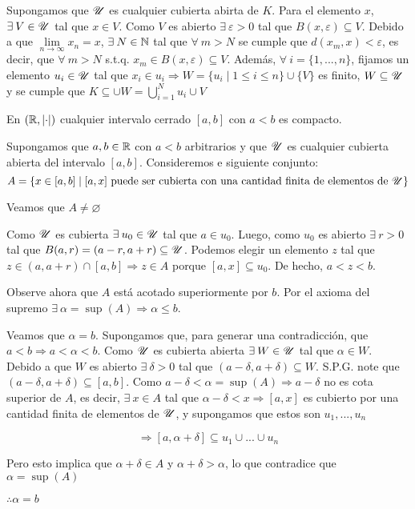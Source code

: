 \begin{proofexplanation}
    Supongamos que $\mathscr{U}$ es cualquier cubierta abirta de $K$. Para el elemento $x$, $\exists \: V \in \mathscr{U}$ tal que $x \in V$. Como $V$ es abierto $\exists \: \varepsilon > 0$ tal que $B(x,\varepsilon) \subseteq V$. Debido a que $\lim\limits_{n \to \infty} x_n = x$, $\exists \: N \in \mathbb{N}$ tal que $\forall \: m > N$ se cumple que $d(x_m,x) < \varepsilon$, es decir, que $\forall \: m > N$ s.t.q. $x_m \in B(x,\varepsilon) \subseteq V$. Además, $\forall \: i = \{ 1, ..., n \}$, fijamos un elemento $u_i \in \mathscr{U}$ tal que $x_i \in u_i \Rightarrow W = \{ u_i \mid 1 \leqslant i \leqslant n \} \cup \{ V \}$ es finito, $W \subseteq \mathscr{U}$ y se cumple que $K \subseteq \cup W =  \bigcup_{i=1}^{N} u_i \cup V$
\end{proofexplanation}

\begin{eg}
    En $(\mathbb{R}, \abs{\cdot})$ cualquier intervalo cerrado $[a,b]$ con $a < b$ es compacto.
\end{eg}

\begin{proofexplanation}
    Supongamos que $a,b \in \mathbb{R}$ con $a < b$ arbitrarios y que $\mathscr{U}$ es cualquier cubierta abierta del intervalo $[a,b]$. Consideremos e siguiente conjunto:
    $$A = \{ x \in [a,b] \mid [a,x] \text{ puede ser cubierta con una cantidad finita de elementos de } \mathscr{U} \}$$

    Veamos que $A \neq \varnothing$

    Como $\mathscr{U}$ es cubierta $\exists \: u_0 \in \mathscr{U}$ tal que $a \in u_0$. Luego, como $u_0$ es abierto $\exists \: r > 0$ tal que $B(a,r) = (a-r,a+r) \subseteq \mathscr{U}$. Podemos elegir un elemento $z$ tal que $z \in (a, a + r) \cap [a,b] \Rightarrow z \in A$ porque $[a,x] \subseteq u_0$. De hecho, $a < z < b$.

    Observe ahora que $A$ está acotado superiormente por $b$. Por el axioma del supremo $\exists \: \alpha = \sup (A) \Rightarrow \alpha \leqslant b$.

    Veamos que $\alpha = b$. Supongamos que, para generar una contradicción, que $a < b \Rightarrow a <  \alpha < b$. Como $\mathscr{U}$ es cubierta abierta $\exists \: W \in \mathscr{U}$ tal que $\alpha \in W$. Debido a que $W$ es abierto $\exists \: \delta > 0$ tal que $(a-\delta, a + \delta ) \subseteq W$. S.P.G. note que $(a-\delta,a+\delta) \subseteq [a,b]$. Como $a-\delta < \alpha = \sup (A) \Rightarrow a - \delta$ no es cota superior de $A$, es decir, $\exists \: x \in A$ tal que $\alpha - \delta < x \Rightarrow [a,x]$ es cubierto por una cantidad finita de elementos de $\mathscr{U}$, y supongamos que estos son $u_1, ..., u_n$

    $$\Rightarrow [a, \alpha + \delta] \subseteq u_1 \cup ... \cup u_n$$

    Pero esto implica que $\alpha + \delta \in A$ y $\alpha + \delta > \alpha$, lo que contradice que $\alpha = \sup (A)$

    $\therefore \alpha = b$
\end{proofexplanation}

